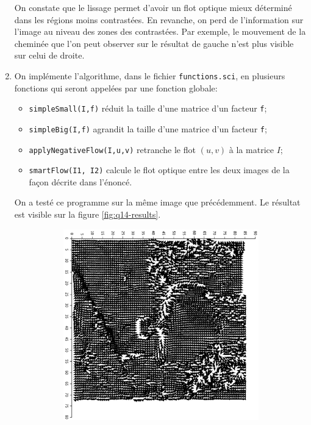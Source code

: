 \begin{enumerate}[questions, start=13]
On constate que le lissage permet d'avoir un flot optique mieux déterminé dans les régions moins contrastées. En revanche, on perd de l'information sur l'image au niveau des zones des contrastées. Par exemple, le mouvement de la cheminée que l'on peut observer sur le résultat de gauche n'est plus visible sur celui de droite.

\item On implémente l'algorithme, dans le fichier \verb|functions.sci|, en plusieurs fonctions qui seront appelées par une fonction globale:
  \begin{itemize}
  \item \verb|simpleSmall(I,f)| réduit la taille d'une matrice d'un facteur \verb|f|;
  \item \verb|simpleBig(I,f)| agrandit la taille d'une matrice d'un facteur \verb|f|;
  \item \verb|applyNegativeFlow(I,u,v)| retranche le flot $(u,v)$ à la matrice $I$;
  \item \verb|smartFlow(I1, I2)| calcule le flot optique entre les deux images de la façon décrite dans l'énoncé.
  \end{itemize}
On a testé ce programme sur la même image que précédemment. Le résultat est visible sur la figure \vref{fig:q14-results}.
\begin{figure}
\centering
  \begin{subfigure}{.6\textwidth}
  \includegraphics[width=\textwidth]{img/q14-results}

\end{subfigure}
\end{figure}
\end{enumerate}
